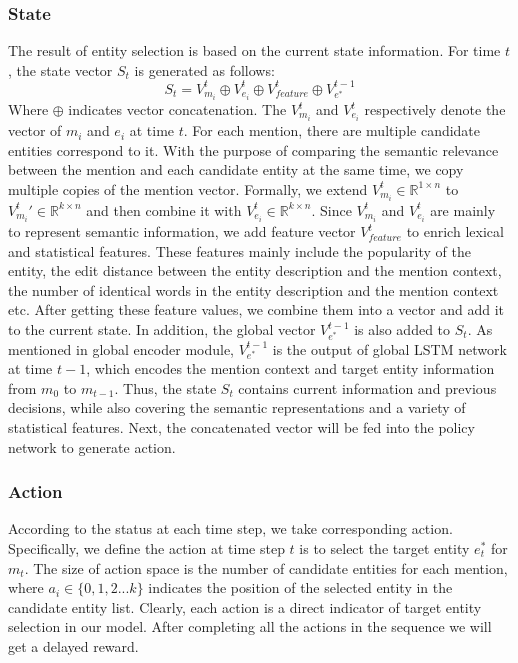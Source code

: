 \documentclass[sigconf]{acmart}
\begin{document}
\subsubsection*{State}
The result of entity selection is based on the current state information. For time $t$, the state vector $S_t$ is generated as follows:
\begin{equation}       
S_t = V_{m_i}^t\oplus{V_{e_i}^t}\oplus{V_{feature}^t}\oplus{V_{e^*}^{t-1}}
\end{equation}
Where $\oplus$ indicates vector concatenation. The $V_{m_i}^t$ and $V_{e_i}^t$ respectively denote the vector of $m_i$ and $e_i$ at time $t$. For each mention, there are multiple candidate entities correspond to it. With the purpose of comparing the semantic relevance between the mention and each candidate entity at the same time, we copy multiple copies of the mention vector. Formally, we extend $V_{m_i}^t \in \mathbb{R}^{1\times{n}}$ to $V_{m_i}^t{'} \in \mathbb{R}^{k\times{n}}$ and then combine it with $V_{e_i}^t \in \mathbb{R}^{k\times{n}}$. Since $V_{m_i}^t$ and $V_{e_i}^t$ are mainly to represent semantic information, we add feature vector $V_{feature}^t$ to enrich lexical and statistical features. These features mainly include the popularity of the entity, the edit distance between the entity description and the mention context, the number of identical words in the entity description and the mention context etc. After getting these feature values, we combine them into a vector and add it to the current state. In addition, the global vector $V_{e^*}^{t-1}$ is also added to $S_t$. As mentioned in global encoder module, $V_{e^*}^{t-1}$ is the output of global LSTM network at time $t-1$, which encodes the mention context and target entity information from $m_0$ to $m_{t-1}$. Thus, the state $S_t$ contains current information and previous decisions, while also covering the semantic representations and a variety of statistical features. Next, the concatenated vector will be fed into the policy network to generate action.

\subsubsection*{Action}
According to the status at each time step, we take corresponding action. Specifically, we define the action at time step $t$ is to select the target entity $e_t^*$ for $m_t$. The size of action space is the number of candidate entities for each mention, where $a_i \in \{0,1,2...k\}$ indicates the position of the selected entity in the candidate entity list. Clearly, each action is a direct indicator of target entity selection in our model. After completing all the actions in the sequence we will get a delayed reward.
\end{document}
